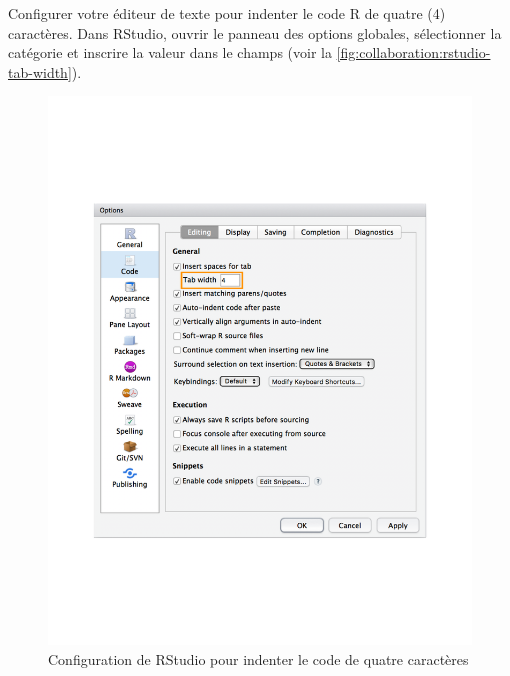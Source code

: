 \begin{exercice}[nosol]
  Configurer votre éditeur de texte pour indenter le code R de quatre
  (4) caractères. Dans RStudio, ouvrir le panneau des options
  globales, sélectionner la catégorie  et inscrire la
  valeur  dans le champs  (voir la
  \autoref{fig:collaboration:rstudio-tab-width}).
  \begin{figure}
    \centering
    \includegraphics{rstudio-tab-width}
    \caption{Configuration de RStudio pour indenter le code de quatre
      caractères}
    \label{fig:collaboration:rstudio-tab-width}
  \end{figure}
\end{exercice}

